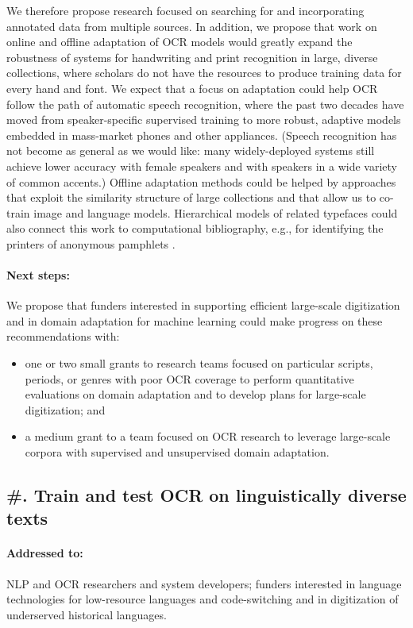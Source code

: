 \documentclass[twoside,11pt]{report}
\newcounter{reccounter}
\renewcommand{\thereccounter}{\arabic{reccounter}}
\newcommand{\recommend}[2]{\refstepcounter{reccounter}%
  \label{rec:#1}%
  \subsection{\#\thereccounter. #2}%
  \label{sec:rec-#1}}
\begin{document}
We therefore propose research focused on searching for and incorporating annotated data from multiple sources. In addition, we propose that work on online and offline adaptation of OCR models would greatly expand the robustness of systems for handwriting and print recognition in large, diverse collections, where scholars do not have the resources to produce training data for every hand and font. We expect that a focus on adaptation could help OCR follow the path of automatic speech recognition, where the past two decades have moved from speaker-specific supervised training to more robust, adaptive models embedded in mass-market phones and other appliances. (Speech recognition has not become as general as we would like: many widely-deployed systems still achieve lower accuracy with female speakers and with speakers in a wide variety of common accents.) Offline adaptation methods could be helped by approaches that exploit the similarity structure of large collections \citep{yalniz11:_partial_duplic_detec_large_book_collec} and that allow us to co-train image and language models. Hierarchical models of related typefaces could also connect this work to computational bibliography, e.g., for identifying the printers of anonymous pamphlets \citep{berg-kirkpatrick18:_print_probab}.

\paragraph{Next steps:} We propose that funders interested in supporting efficient large-scale digitization and in domain adaptation for machine learning could make progress on these recommendations with:
\begin{itemize}

\item one or two small grants to research teams focused on particular scripts, periods, or genres with poor OCR coverage to perform quantitative evaluations on domain adaptation and to develop plans for large-scale digitization; and

\item a medium grant to a team focused on OCR research to leverage large-scale corpora with supervised and unsupervised domain adaptation.

\end{itemize}

\recommend{diverse}{Train and test OCR on linguistically diverse texts}

\paragraph{Addressed to:} NLP and OCR researchers and system developers; funders interested in language technologies for low-resource languages and code-switching and in digitization of underserved historical languages.
\end{document}
